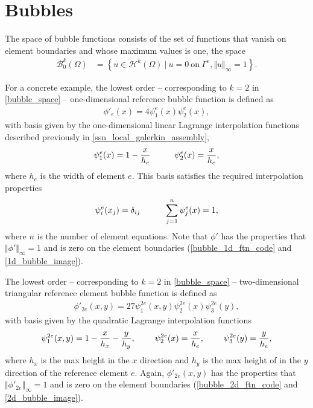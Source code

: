 \section{Bubbles}

The space of bubble functions consists of the set of functions that vanish on element boundaries and whose maximum values is one, the space
\begin{align}
  \label{bubble_space}
  \mathcal{B}_0^k(\Omega) &= \left\{ u \in \mathcal{H}^k(\Omega)\ |\ u = 0\ \text{on}\ \Gamma^e, \Vert u \Vert_{\infty} = 1 \right\}.
\end{align}

For a concrete example, the lowest order -- corresponding to $k = 2$ in \cref{bubble_space} -- one-dimensional reference bubble function is defined as
\begin{align}
  \label{bubble_function}
  \phi'_e(x) = 4 \psi_1^e(x) \psi_2^e(x),
\end{align}
with basis given by the one-dimensional linear Lagrange interpolation functions described previously in \cref{ssn_local_galerkin_assembly}, 
\begin{align*}
  \psi_1^e(x) = 1 - \frac{x}{h_e} \hspace{10mm} \psi_2^e(x) = \frac{x}{h_e},
\end{align*}
where $h_e$ is the width of element $e$.  This basis satisfies the required interpolation properties
\begin{align*}
  \psi_i^e(x_j) = \delta_{ij} \hspace{10mm} \sum_{j=1}^n \psi_j^e(x) = 1,
\end{align*}
where $n$ is the number of element equations.  Note that $\phi'$ has the properties that $\Vert \phi' \Vert_{\infty} = 1$ and is zero on the element boundaries (\cref{bubble_1d_ftn_code} and \cref{1d_bubble_image}).

The lowest order -- corresponding to $k = 2$ in \cref{bubble_space} -- two-dimensional triangular reference element bubble function is defined as
\begin{align}
  \label{2d_bubble_function}
  \phi'_{2e}(x,y) = 27 \psi_1^{2e}(x,y) \psi_2^{2e}(x) \psi_3^{2e}(y),
\end{align}
with basis given by the quadratic Lagrange interpolation functions
\begin{align*}
  \psi_1^{2e}(x,y) = 1 - \frac{x}{h_x} - \frac{y}{h_y}, \hspace{8mm} \psi_2^{2e}(x) = \frac{x}{h_e}, \hspace{8mm} \psi_3^{2e}(y) = \frac{y}{h_e},
\end{align*}
where $h_x$ is the max height in the $x$ direction and $h_y$ is the max height of in the $y$ direction of the reference element $e$.  Again, $\phi'_{2e}(x,y)$ has the properties that $\Vert \phi'_{2e} \Vert_{\infty} = 1$ and is zero on the element boundaries (\cref{bubble_2d_ftn_code} and \cref{2d_bubble_image}).

